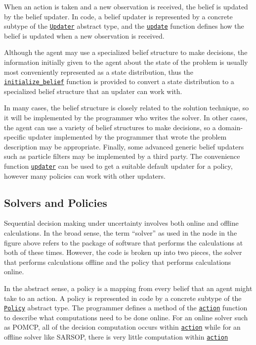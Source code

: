 \documentclass[12pt,]{article}
\begin{document}
When an action is taken and a new observation is received, the belief is
updated by the belief updater. In code, a belief updater is represented
by a concrete subtype of the
\href{api.md\#POMDPs.Updater}{\texttt{Updater}} abstract type, and the
\href{api.md\#POMDPs.update}{\texttt{update}} function defines how the
belief is updated when a new observation is received.

Although the agent may use a specialized belief structure to make
decisions, the information initially given to the agent about the state
of the problem is usually most conveniently represented as a state
distribution, thus the
\href{api.md\#POMDPs.initialize_belief}{\texttt{initialize\_belief}}
function is provided to convert a state distribution to a specialized
belief structure that an updater can work with.

In many cases, the belief structure is closely related to the solution
technique, so it will be implemented by the programmer who writes the
solver. In other cases, the agent can use a variety of belief structures
to make decisions, so a domain-specific updater implemented by the
programmer that wrote the problem description may be appropriate.
Finally, some advanced generic belief updaters such as particle filters
may be implemented by a third party. The convenience function
\href{api.md\#POMDPs.updater}{\texttt{updater}} can be used to get a
suitable default updater for a policy, however many policies can work
with other updaters.

\subsection{Solvers and Policies}\label{solvers-and-policies}

Sequential decision making under uncertainty involves both online and
offline calculations. In the broad sense, the term ``solver'' as used in
the node in the figure above refers to the package of software that
performs the calculations at both of these times. However, the code is
broken up into two pieces, the solver that performs calculations offline
and the policy that performs calculations online.

In the abstract sense, a policy is a mapping from every belief that an
agent might take to an action. A policy is represented in code by a
concrete subtype of the \href{api.md\#POMDPs.Policy}{\texttt{Policy}}
abstract type. The programmer defines a method of the
\href{api.md\#POMDPs.action}{\texttt{action}} function to describe what
computations need to be done online. For an online solver such as POMCP,
all of the decision computation occurs within
\href{api.md\#POMDPs.action}{\texttt{action}} while for an offline
solver like SARSOP, there is very little computation within
\href{api.md\#POMDPs.action}{\texttt{action}}
\end{document}

